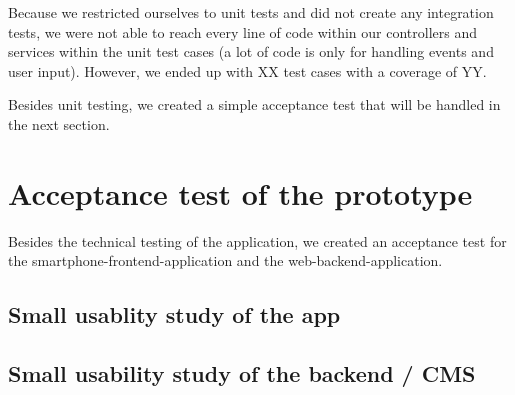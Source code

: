Because we restricted ourselves to unit tests and did not create any integration tests, we were not able to reach every line of code within our controllers and services within the unit test cases (a lot of code is only for handling events and user input). However, we ended up with XX test cases with a coverage of YY. 

Besides unit testing, we created a simple acceptance test that will be handled in the next section.

\section{Acceptance test of the prototype}
Besides the technical testing of the application, we created an acceptance test for the smartphone-frontend-application and the web-backend-application.

\subsection{Small usablity study of the app}

\subsection{Small usability study of the backend / CMS}
